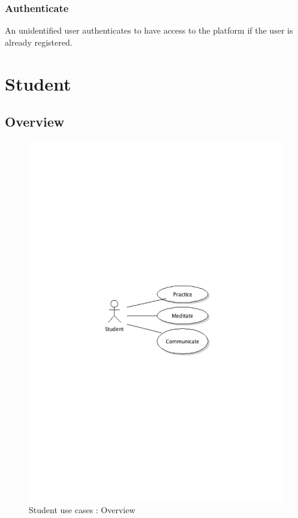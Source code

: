 		\subsubsection{Authenticate}An unidentified user authenticates to have access to the platform if the user is already registered.
\newpage
\section{Student}
	\subsection{Overview}
		\begin{figure}[ht]
			\begin{center}
				\includegraphics[width=\textwidth,  trim=2cm 12cm 2cm 12cm]{UML_figure/UC/student/UC_Student_General.pdf}
				\caption{Student use cases : Overview}
			\end{center}
		\end{figure}
